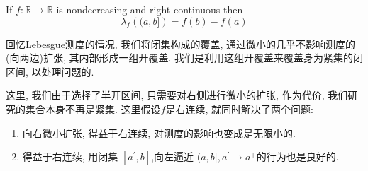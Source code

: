 \documentclass[../main.tex]{subfiles}
\begin{document}
\begin{theorem}{}{}
    If \(  f:\mathbb{R} \to \mathbb{R}   \) is nondecreasing and right-continuous then \[
     \lambda _{f}\left( (a,b] \right) =  f\left( b \right)-f\left( a \right)   
    \] 
\end{theorem}
\begin{note}
    回忆Lebesgue测度的情况, 我们将闭集构成的覆盖, 通过微小的几乎不影响测度的(向两边)扩张, 其内部形成一组开覆盖. 我们是利用这组开覆盖来覆盖身为紧集的闭区间, 以处理问题的.

    这里, 我们由于选择了半开区间, 只需要对右侧进行微小的扩张, 作为代价, 我们研究的集合本身不再是紧集.  这里假设\(  f  \)是右连续, 就同时解决了两个问题: 
    \begin{enumerate}
        \item 向右微小扩张, 得益于右连续, 对测度的影响也变成是无限小的.
        \item 得益于右连续, 用闭集 \(  [a^{\prime} ,b]  \),向左逼近 \(  (a,b], a^{\prime} \to a  ^{+ }\)的行为也是良好的. 
    \end{enumerate}
     
\end{note}
\end{document}
